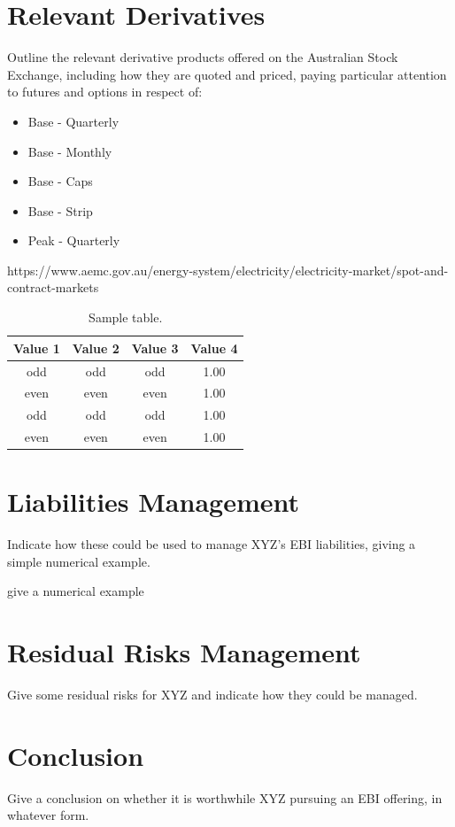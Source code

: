 \documentclass[12pt]{article}
\begin{document}
\section{Relevant Derivatives}
Outline the relevant derivative products offered on the Australian Stock Exchange, including how they are quoted and priced, paying particular attention to futures and options in respect of: 
\begin{itemize}
 \item Base - Quarterly
 \item Base - Monthly
 \item Base - Caps
 \item Base - Strip
 \item Peak - Quarterly
\end{itemize}
https://www.aemc.gov.au/energy-system/electricity/electricity-market/spot-and-contract-markets

\begin{table}[!h]
\centering
\caption{Sample table.}
\begin{tabular}{cccc}
\toprule
Value 1 & Value 2 & Value 3 & Value 4\\
\midrule
 odd     & odd   & odd & 1.00 \\
 even    & even  & even& 1.00 \\
 odd     & odd   & odd & 1.00 \\
 even    & even  & even& 1.00 \\
\bottomrule
\end{tabular}
\end{table}

\section{Liabilities Management}
Indicate how these could be used to manage XYZ’s EBI liabilities, giving a simple numerical example. \par

give a numerical example
\frameboxend

\section{Residual Risks Management}
Give some residual risks for XYZ and indicate how they could be managed. 

\section{Conclusion}
Give a conclusion on whether it is worthwhile XYZ pursuing an EBI offering, in whatever form. 

\printbibliography[heading=bibintoc]
\end{document}
